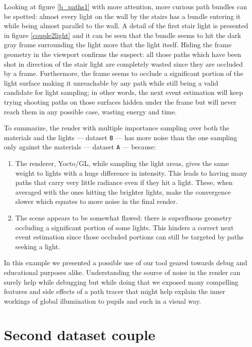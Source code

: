 Looking at figure \ref{b_paths1} with more attention, more curious path bundles can be spotted: almost every light on the wall by the stairs has a bundle entering it while being almost parallel to the wall. A detail of the first stair light is presented in figure \ref{couple2light} and it can be seen that the bundle seems to hit the dark gray frame surrounding the light more that the light itself. Hiding the frame geometry in the viewport confirms the suspect: all those paths which have been shot in direction of the stair light are completely wasted since they are occluded by a frame. Furthermore, the frame seems to occlude a significant portion of the light surface making it unreachable by any path while still being a valid candidate for light sampling; in other words, the next event estimation will keep trying shooting paths on those surfaces hidden under the frame but will never reach them in any possible case, wasting energy and time.

To summarize, the render with multiple importance sampling over both the materials and the lights --- dataset \texttt{B} --- has more noise than the one sampling only against the materials --- dataset \texttt{A} --- because:
\begin{enumerate}
	\item The renderer, Yocto/GL, while sampling the light areas, gives the same weight to lights with a huge difference in intensity. This leads to having many paths that carry very little radiance even if they hit a light. These, when averaged with the ones hitting the brighter lights, make the convergence slower which equates to more noise in the final render.
	\item The scene appears to be somewhat flawed: there is superfluous geometry occluding a significant portion of some lights. This hinders a correct next event estimation since those occluded portions can still be targeted by paths seeking a light.
\end{enumerate}

In this example we presented a possible use of our tool geared towards debug and educational purposes alike. Understanding the source of noise in the render can surely help while debugging but while doing that we exposed many compelling features and side effects of a path tracer that might help explain the inner workings of global illumination to pupils and such in a visual way.

\section{Second dataset couple}

